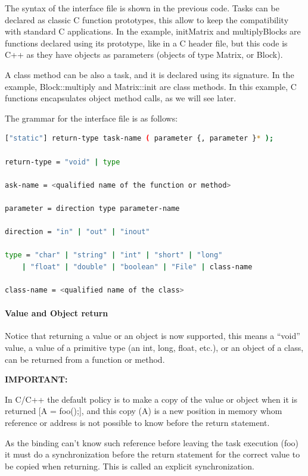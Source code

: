 The syntax of the interface file is shown in the previous code. Tasks can be declared as classic 
C function prototypes, this allow to keep the compatibility with standard C applications. 
In the example, initMatrix and multiplyBlocks are functions declared using its prototype, 
like in a C header file, but this code is C++ as they have objects as parameters (objects of 
type Matrix, or Block).

A class method can be also a task, and it is declared using its signature. In the example, 
Block::multiply and Matrix::init are class methods. In this example, C functions encapsulates 
object method calls, as we will see later.

The grammar for the interface file is as follows:

\begin{lstlisting}[language=bash]
["static"] return-type task-name ( parameter {, parameter }* );

return-type = "void" | type

ask-name = <qualified name of the function or method>

parameter = direction type parameter-name

direction = "in" | "out" | "inout"

type = "char" | "string" | "int" | "short" | "long"
    | "float" | "double" | "boolean" | "File" | class-name

class-name = <qualified name of the class>
\end{lstlisting}

       
\paragraph{Value and Object return}
Notice that returning a value or an object is now supported, this means a ``void'' value, a value 
of a primitive type (an int, long, float, etc.), or an object of a class, can be returned from a 
function or method.

{\bf IMPORTANT:}

In C/C++ the default policy is to make a copy of the value or object when it is returned [A = foo();], 
and this copy (A) is a new position in memory whom reference or address is not possible to know before 
the return statement.

As the binding can’t know such reference before leaving the task execution (foo) it must do a 
synchronization before the return statement for the correct value to be copied when returning. 
This is called an explicit synchronization.

